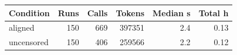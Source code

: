 \begin{tabular}{lrrrrr}
\toprule
Condition & Runs & Calls & Tokens & Median s & Total h \\
\midrule
aligned & 150 & 669 & 397351 & 2.4 & 0.13 \\
uncensored & 150 & 406 & 259566 & 2.2 & 0.12 \\
\bottomrule
\end{tabular}
